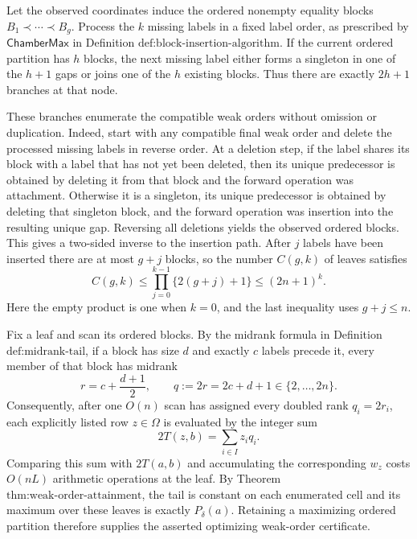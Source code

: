 Let the observed coordinates induce the ordered nonempty equality blocks
\(B_1\prec\cdots\prec B_g\).  Process the \(k\) missing labels in a fixed
label order, as prescribed by \(\mathsf{ChamberMax}\) in
Definition \(\text{def:block-insertion-algorithm}\).  If the current ordered
partition has \(h\) blocks, the next missing label either forms a singleton
in one of the \(h+1\) gaps or joins one of the \(h\) existing blocks.  Thus
there are exactly \(2h+1\) branches at that node.

These branches enumerate the compatible weak orders without omission or
duplication.  Indeed, start with any compatible final weak order and delete
the processed missing labels in reverse order.  At a deletion step, if the
label shares its block with a label that has not yet been deleted, then its
unique predecessor is obtained by deleting it from that block and the forward
operation was attachment.  Otherwise it is a singleton, its unique predecessor
is obtained by deleting that singleton block, and the forward operation was
insertion into the resulting unique gap.  Reversing all deletions yields the
observed ordered blocks.  This gives a two-sided inverse to the insertion path.
After \(j\) labels have been inserted there are at most \(g+j\) blocks, so the
number \(C(g,k)\) of leaves satisfies
\[
 C(g,k)\le \prod_{j=0}^{k-1}\{2(g+j)+1\}
 \le (2n+1)^k.
\]
Here the empty product is one when \(k=0\), and the last inequality uses
\(g+j\le n\).

Fix a leaf and scan its ordered blocks.  By the midrank formula in
Definition \(\text{def:midrank-tail}\), if a block has size \(d\) and exactly
\(c\) labels precede it, every member of that block has midrank
\[
 r=c+\frac{d+1}{2},
 \qquad q:=2r=2c+d+1\in\{2,\ldots,2n\}.
\]
Consequently, after one \(O(n)\) scan has assigned every doubled rank
\(q_i=2r_i\), each explicitly listed row \(z\in\Omega\) is evaluated by the
integer sum
\[
 2T(z,b)=\sum_{i\in I}z_iq_i.
\]
Comparing this sum with \(2T(a,b)\) and accumulating the corresponding
\(w_z\) costs \(O(nL)\) arithmetic operations at the leaf.  By
Theorem \(\text{thm:weak-order-attainment}\), the tail is constant on each
enumerated cell and its maximum over these leaves is exactly
\(P_\delta(a)\).  Retaining a maximizing ordered partition therefore supplies
the asserted optimizing weak-order certificate.

